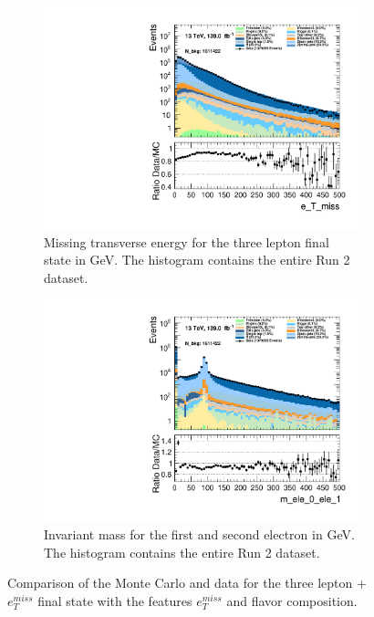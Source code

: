 \begin{figure}[H]
    \centering
    \begin{subfigure}{.6\textwidth}
        \includegraphics[width=\textwidth]{Figures/MC_Data_comp/lep3/e_T_miss_3lep.pdf}
        \caption{Missing transverse energy for the three lepton final state in GeV. The histogram contains the entire Run 2 dataset.}
        \label{fig:etmiss}
    \end{subfigure}
    \hfill
    \begin{subfigure}{.6\textwidth}
        \includegraphics[width=\textwidth]{Figures/MC_Data_comp/lep3/m_ele_0_ele_1_3lep.pdf}
        \caption{Invariant mass for the first and second electron in GeV. The histogram contains the entire Run 2 dataset. }
        \label{fig:mll_3lep}
    \end{subfigure}
    \hfill        
    \caption[3 lepton + $e_T^{miss}$ Monte Carlo and ATLAS data comparison]{Comparison of the Monte Carlo and data for the three lepton + $e_T^{miss}$ final state with the features $e_{T}^{miss}$ and flavor composition.
    }
    \label{fig:MC_Data_comp}
\end{figure}

